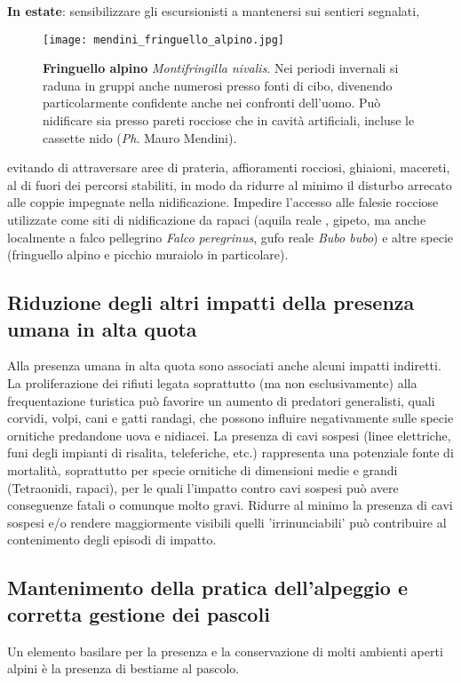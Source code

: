 \documentclass[10pt,twoside,openany,x11names,svgnames,italian,a5paper,dvipsnames,table]{memoir}
\newcommand{\ph}{\emph{Ph}. }
\begin{document}
\textbf{In estate}: sensibilizzare gli escursionisti a mantenersi sui sentieri segnalati, \begin{wrapfigure}[18]{r}{.6\columnwidth}
\centering
  \texttt{[image: mendini\_fringuello\_alpino.jpg]}
  \caption*{\textbf{Fringuello alpino} \emph{Montifringilla nivalis}. Nei periodi invernali si raduna in gruppi anche numerosi presso fonti di cibo, divenendo particolarmente confidente anche nei confronti dell'uomo. Può nidificare sia presso pareti rocciose che in cavità artificiali, incluse le cassette nido (\ph Mauro Mendini).}
\end{wrapfigure}evitando di attraversare aree di prateria, affioramenti rocciosi, ghiaioni, macereti, al di fuori dei percorsi stabiliti, in modo da ridurre al minimo il disturbo arrecato alle coppie impegnate nella nidificazione. Impedire l'accesso alle falesie rocciose utilizzate come siti di nidificazione da rapaci (aquila reale
\cite{Pedrini91}, gipeto, ma anche localmente a falco pellegrino \emph{Falco peregrinus}, gufo reale \emph{Bubo bubo}) e altre specie (fringuello alpino e picchio muraiolo in particolare).
\newpage
\subsection{Riduzione degli altri impatti della presenza umana in alta quota}
Alla presenza umana in alta quota sono associati anche alcuni impatti indiretti. La proliferazione dei rifiuti legata soprattutto (ma non esclusivamente) alla frequentazione turistica può favorire un aumento di predatori generalisti, quali corvidi, volpi, cani e gatti randagi, che possono influire negativamente sulle specie ornitiche predandone uova e nidiacei. La presenza di cavi sospesi (linee elettriche, funi degli impianti di risalita, teleferiche, etc.) rappresenta una potenziale fonte di mortalità, soprattutto per specie ornitiche di dimensioni medie e grandi (Tetraonidi, rapaci), per le quali l'impatto contro cavi sospesi può avere conseguenze fatali o comunque molto gravi. Ridurre al minimo la presenza di cavi sospesi e/o rendere maggiormente visibili quelli 'irrinunciabili' può contribuire al contenimento degli episodi di impatto.


\subsection{Mantenimento della pratica dell'alpeggio e corretta gestione dei pascoli}
Un elemento basilare per la presenza e la conservazione di molti ambienti aperti alpini è la presenza di bestiame al pascolo.
\end{document}
